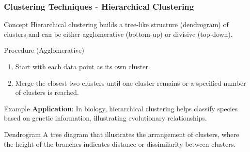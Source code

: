 \documentclass[aspectratio=169]{beamer}
\begin{document}
\begin{frame}[fragile]
    \frametitle{Clustering Techniques - Hierarchical Clustering}
    \begin{block}{Concept}
        Hierarchical clustering builds a tree-like structure (dendrogram) of clusters and can be either agglomerative (bottom-up) or divisive (top-down).
    \end{block}

    \begin{block}{Procedure (Agglomerative)}
        \begin{enumerate}
            \item Start with each data point as its own cluster.
            \item Merge the closest two clusters until one cluster remains or a specified number of clusters is reached.
        \end{enumerate}
    \end{block}

    \begin{block}{Example}
        \textbf{Application}: In biology, hierarchical clustering helps classify species based on genetic information, illustrating evolutionary relationships.
    \end{block}

    \begin{block}{Dendrogram}
        A tree diagram that illustrates the arrangement of clusters, where the height of the branches indicates distance or dissimilarity between clusters.
    \end{block}
\end{frame}
\end{document}
